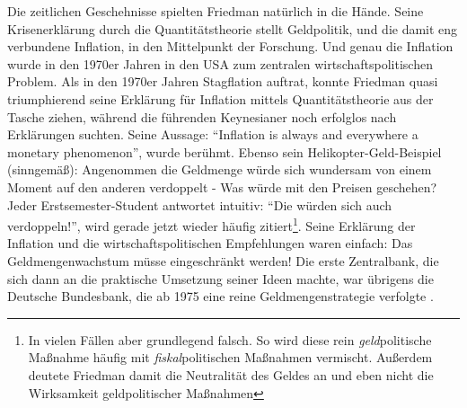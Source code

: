 Die zeitlichen Geschehnisse spielten Friedman natürlich in die Hände. Seine Krisenerklärung durch die Quantitätstheorie stellt Geldpolitik, und die damit eng verbundene Inflation, in den Mittelpunkt der Forschung. Und genau die Inflation wurde in den 1970er Jahren in den USA zum zentralen wirtschaftspolitischen Problem. Als in den 1970er Jahren Stagflation auftrat, konnte Friedman quasi triumphierend seine Erklärung für Inflation mittels Quantitätstheorie aus der Tasche ziehen, während die führenden Keynesianer noch erfolglos nach Erklärungen suchten. Seine Aussage: "`Inflation is always and everywhere a monetary phenomenon"', wurde berühmt. Ebenso sein Helikopter-Geld-Beispiel \parencite{Friedman1969} (sinngemäß): Angenommen die Geldmenge würde sich wundersam von einem Moment auf den anderen verdoppelt - Was würde mit den Preisen geschehen? Jeder Erstsemester-Student antwortet intuitiv: "`Die würden sich auch verdoppeln!"', wird gerade jetzt wieder häufig zitiert\footnote{In vielen Fällen aber grundlegend falsch. So wird diese rein \textit{geld}politische Maßnahme häufig mit \textit{fiskal}politischen Maßnahmen vermischt. Außerdem deutete Friedman damit die Neutralität des Geldes an und eben nicht die Wirksamkeit geldpolitischer Maßnahmen}. Seine Erklärung der Inflation und die wirtschaftspolitischen Empfehlungen waren einfach: Das Geldmengenwachstum müsse eingeschränkt werden!   
Die erste Zentralbank, die sich dann an die praktische Umsetzung seiner Ideen machte, war übrigens die Deutsche Bundesbank, die ab 1975 eine reine Geldmengenstrategie verfolgte \parencite[S. 36]{BBK2016}. 
